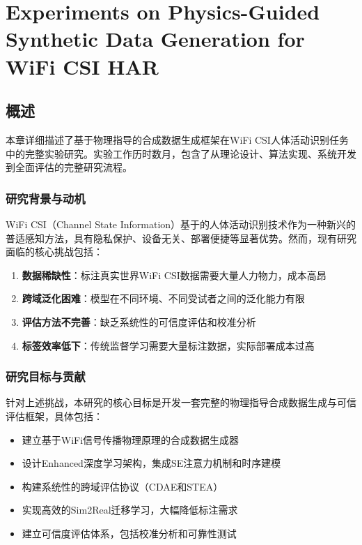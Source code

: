 
\chapter{Experiments on Physics-Guided Synthetic Data Generation for WiFi CSI HAR}
\label{chap:experiments}

\section{概述}
\label{sec:overview}

本章详细描述了基于物理指导的合成数据生成框架在WiFi CSI人体活动识别任务中的完整实验研究。实验工作历时数月，包含了从理论设计、算法实现、系统开发到全面评估的完整研究流程。

\subsection{研究背景与动机}
\label{subsec:motivation}

WiFi CSI（Channel State Information）基于的人体活动识别技术作为一种新兴的普适感知方法，具有隐私保护、设备无关、部署便捷等显著优势。然而，现有研究面临的核心挑战包括：

\begin{enumerate}
\item \textbf{数据稀缺性}：标注真实世界WiFi CSI数据需要大量人力物力，成本高昂
\item \textbf{跨域泛化困难}：模型在不同环境、不同受试者之间的泛化能力有限  
\item \textbf{评估方法不完善}：缺乏系统性的可信度评估和校准分析
\item \textbf{标签效率低下}：传统监督学习需要大量标注数据，实际部署成本过高
\end{enumerate}

\subsection{研究目标与贡献}
\label{subsec:objectives}

针对上述挑战，本研究的核心目标是开发一套完整的物理指导合成数据生成与可信评估框架，具体包括：

\begin{itemize}
\item 建立基于WiFi信号传播物理原理的合成数据生成器
\item 设计Enhanced深度学习架构，集成SE注意力机制和时序建模
\item 构建系统性的跨域评估协议（CDAE和STEA）
\item 实现高效的Sim2Real迁移学习，大幅降低标注需求
\item 建立可信度评估体系，包括校准分析和可靠性测试
\end{itemize}

